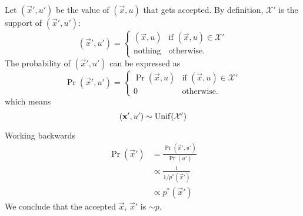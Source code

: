     Let $(\vec x', u')$ be the value of $(\vec x, u)$ that gets accepted. By definition, $\mathcal X'$ is the support of $(\vec x', u')$:
    \begin{equation}
        (\vec x', u') =
            \begin{cases}
                (\vec x, u)     & \text{if } (\vec x, u) \in \mathcal X' \\
                \text{nothing}  & \text{otherwise.}
            \end{cases}
    \end{equation}
    The probability of $(\vec x', u')$ can be expressed as
    \begin{equation}
        \Pr(\vec x', u') =
            \begin{cases}
                \Pr(\vec x, u)  & \text{if } (\vec x, u) \in \mathcal X' \\
                0               & \text{otherwise.}
            \end{cases}
    \end{equation}
    which means
    \begin{equation}
        (\boldsymbol{\mathbf{x}}', u') \sim \operatorname{Unif}(\mathcal X')
    \end{equation}

    Working backwards
    \begin{align}
        \Pr(\vec x')    &= \frac{\Pr(\vec x', u')}{\Pr(u')} \\
                        &\propto \frac{1}{1 / p^\ast(\vec x')} \\
                        &\propto p^\ast(\vec x')
    \end{align}
    We conclude that the accepted $\vec x$, $\vec x'$ is $\sim p$.